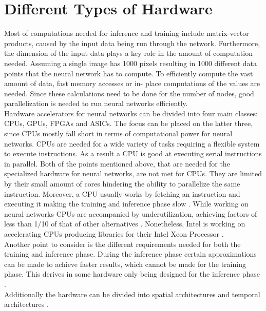 \documentclass[conference]{IEEEtran}
\begin{document}
	\section{Different Types of Hardware}
	Most of computations needed for inference and training include matrix-vector products, caused by the input data being run through the network.
	Furthermore, the dimension of the input data plays a key role in the amount of computation needed. Assuming a single image has 1000 pixels resulting in 1000 different data points that the neural network has to compute. To efficiently compute the vast amount of data, fast memory accesses or in- place computations of the values are needed. Since these calculations need to be done for the number of nodes, good parallelization is needed to run neural networks efficiently.
	\\
	Hardware accelerators for neural networks can be divided into four main classes: CPUs, GPUs, FPGAs and ASICs. The focus can be placed on the latter three, since CPUs mostly fall short in terms of computational power for neural networks. 
	CPUs are needed for a wide variety of tasks requiring a flexible system to execute instructions. As a result a CPU is good at executing serial instructions in parallel.
	Both of the points mentioned above, that are needed for the specialized hardware for neural networks, are not met for CPUs. They are limited by their small amount of cores hindering the ability to parallelize the same instruction. Moreover, a CPU usually works by fetching an instruction and executing it making the training and inference phase slow \cite{capra2020updated}. While working on neural networks CPUs are accompanied by underutilization, achieving factors of less than 1/10 of that of other alternatives \cite{nurvitadhi2016accelerating}. Nonetheless, Intel is working on accelerating CPUs producing libraries for their Intel Xeon Processor \cite{intelnn}.
	\\
	Another point to consider is the different requirements needed for both the training and inference phase. During the inference phase certain approximations can be made to achieve faster results, which cannot be made for the training phase. This derives in some hardware only being designed for the inference phase \cite{jouppi2017datacenter}. 
	\\
	Additionally the hardware can be divided into spatial architectures and temporal architectures \cite{sze2017efficient}. 
\end{document}
